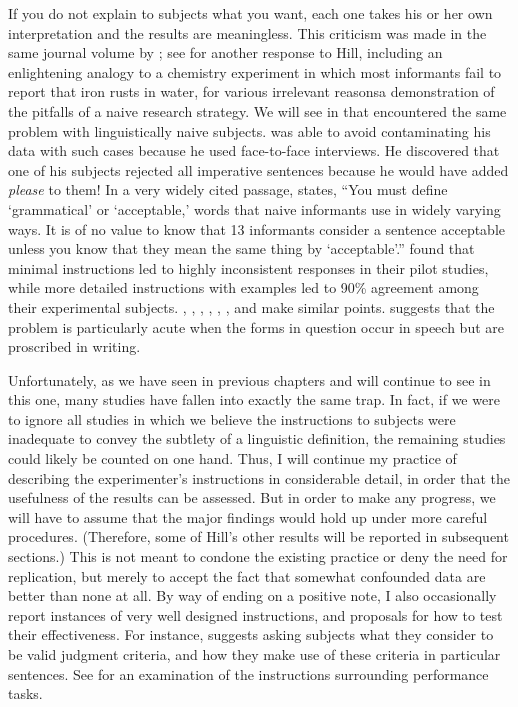  If you do not explain to subjects what you want, each one takes his or her own interpretation and the results are meaningless. This criticism was made in the same journal volume by \citet{Chomsky1961}; see \citet{Lees1976} for another response to Hill, including an enlightening analogy to a chemistry experiment in which most informants fail to report that iron rusts in water, for various irrelevant reasons\schdash{}a demonstration of the pitfalls of a naive research strategy. We will see in  that \citet{MaclayEtAl1960} encountered the same problem with linguistically naive subjects. \citet{Carden1976a} was able to avoid contaminating his data with such cases because he used face-to-face interviews. He discovered that one of his subjects rejected all imperative sentences because he would have added \textit{please} to them! In a very widely cited passage, \citet{Carden1970a} states, ``You must define `grammatical' or `acceptable,' words that naive informants use in widely varying ways. It is of no value to know that 13 informants consider a sentence acceptable unless you know that they mean the same thing by `acceptable'.'' \citet{BleyVromanEtAl1988} found that minimal instructions led to highly inconsistent responses in their pilot studies, while more detailed instructions with examples led to 90\% agreement among their experimental subjects. \citet{Coleman1965}, \citet{QuirkEtAl1966}, \citet{Schnitser1973}, \citet{Cohen1981}, \citet{Greenbaum1977c}, \citet{Newmeyer1983},
 and \citet{Botha1973} make similar points. \citet{Birdsong1989} suggests that the problem is particularly acute when the forms in question occur in speech but are proscribed in writing.

Unfortunately, as we have seen in previous chapters and will continue to see in this one, many studies have fallen into exactly the same trap. In fact, if we were to ignore all studies in which we believe the instructions to subjects were inadequate to convey the subtlety of a linguistic definition, the remaining studies could likely be counted on one hand. Thus, I will continue my practice of describing the experimenter's instructions in considerable detail, in order that the usefulness of the results can be assessed. But in order to make any progress, we will have to assume that the major findings would hold up under more careful procedures. (Therefore, some of Hill's other results will be reported in subsequent sections.) This is not meant to condone the existing practice or deny the need for replication, but merely to accept the fact that somewhat confounded data are better than none at all. By way of ending on a positive note, I also occasionally report instances of very well designed instructions, and proposals for how to test their effectiveness. For instance, \citet{Chaudron1983} suggests asking subjects what they consider to be valid judgment criteria, and how they make use of these criteria in particular sentences. See \citet{GreenbaumEtAl1970} for an examination of the instructions surrounding performance tasks.


